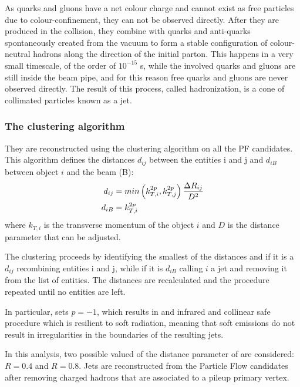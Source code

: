As quarks and gluons have a net colour charge and cannot exist as free particles due to colour-confinement, they can not be observed directly.
After they are produced in the collision, they combine with quarks and anti-quarks spontaneously created from the vacuum
to form a stable configuration of colour-neutral hadrons along the direction of the initial parton.
This happens in a very small timescale, of the order of $10^{-15}$ s, while the involved quarks and gluons are still inside the beam pipe,
and for this reason free quarks and gluons are never observed directly.
The result of this process, called hadronization, is a cone of collimated particles known as a jet.

\subsubsection[The anti-kt clustering algorithm]{The \antikt clustering algorithm} %

They are reconstructed using the \antikt clustering algorithm \cite{Cacciari:2008gp} on all the PF candidates.
This algorithm defines the distances $d_{ij}$ between the entities i and j and $d_{iB}$ between object $i$ and the beam (B):
\begin{equation}
\begin{split}
d_{ij} &= min \left( k^{2p}_{T,i}, k^{2p}_{T,j} \right) \frac{\Delta R_{ij}}{D^2}\\
d_{iB} &= k^{2p}_{T,i}
\end{split}
\end{equation}
where $k_{T, i}$ is the transverse momentum of the object $i$ and $D$ is the distance parameter that can be adjusted.

The clustering proceeds by identifying the smallest of the distances and if it is a $d_{ij}$ recombining entities i and j,
while if it is $d_{iB}$ calling $i$ a jet and removing it from the list of entities.
The distances are recalculated and the procedure repeated until no entities are left.

In particular, \antikt sets $p = -1$, which results in and infrared and collinear safe procedure which is resilient to soft radiation,
meaning that soft emissions do not result in irregularities in the boundaries of the resulting jets.

In this analysis, two possible valued of the distance parameter of \antikt are considered: $R = 0.4$ and $R = 0.8$.
Jets are reconstructed from the Particle Flow candidates after removing charged hadrons that are associated to a pileup primary vertex.
